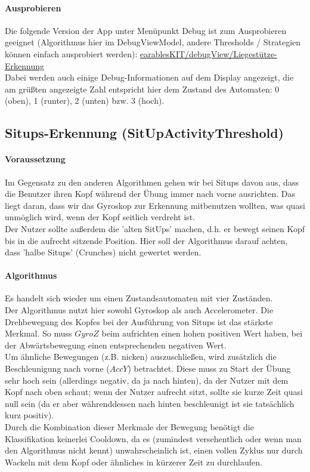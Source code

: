 \documentclass[a4paper,12pt]{article}
\begin{document}
\paragraph{Ausprobieren}
Die folgende Version der App unter Menüpunkt Debug ist zum Ausprobieren geeignet (Algorithmus hier im DebugViewModel, andere Thresholds / Strategien können einfach ausprobiert werden): 
\href{https://github.com/vlle1/earablesKIT/commit/6a4999ac8e2613298a6e6dd9bc85092ddd1b6133}{earablesKIT/debugView/Liegestütze-Erkennung}\\
Dabei werden auch einige Debug-Informationen auf dem Display angezeigt, die am grüßten angezeigte Zahl entspricht hier dem Zustand des Automaten: 0 (oben), 1 (runter), 2 (unten) bzw. 3 (hoch).

\subsection{Situps-Erkennung (SitUpActivityThreshold)}
\paragraph{Voraussetzung} 
Im Gegensatz zu den anderen Algorithmen gehen wir bei Situps davon aus, dass die Benutzer ihren Kopf während der Übung immer nach vorne ausrichten. Das liegt daran, dass wir das Gyroskop zur Erkennung mitbenutzen wollten, was quasi unmöglich wird, wenn der Kopf seitlich verdreht ist.\\
Der Nutzer sollte außerdem die 'alten SitUps' machen, d.h. er bewegt seinen Kopf bis in die aufrecht sitzende Position. Hier soll der Algorithmus darauf achten, dass 'halbe Situps' (Crunches) nicht gewertet werden.
\paragraph{Algorithmus}
Es handelt sich wieder um einen Zustandsautomaten mit vier Zuständen.\\
Der Algorithmus nutzt hier sowohl Gyroskop als auch Accelerometer. Die Drehbewegung des Kopfes bei der Ausführung von Situps ist das stärkste Merkmal. So muss $GyroZ$ beim aufrichten einen hohen positiven Wert haben, bei der Abwärtsbewegung einen entsprechenden negativen Wert.\\
Um ähnliche Bewegungen (z.B. nicken) auszuschließen, wird zusätzlich die Beschleunigung nach vorne ($AccY$) betrachtet. Diese muss zu Start der Übung sehr hoch sein (allerdings negativ, da ja nach hinten), da der Nutzer mit dem Kopf nach oben schaut; wenn der Nutzer aufrecht sitzt, sollte sie kurze Zeit quasi null sein (da er aber währenddessen nach hinten beschleunigt ist sie tatsächlich kurz positiv).\\
Durch die Kombination dieser Merkmale der Bewegung benötigt die Klassifikation keinerlei Cooldown, da es (zumindest versehentlich oder wenn man den Algorithmus nicht kennt) unwahrscheinlich ist, einen vollen Zyklus nur durch Wackeln mit dem Kopf oder ähnliches in kürzerer Zeit zu durchlaufen.
\end{document}
